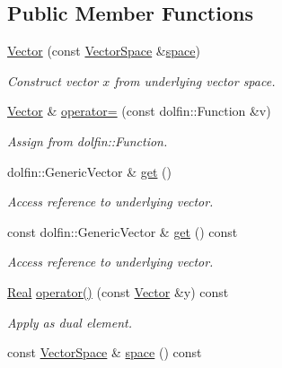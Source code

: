 \subsection*{Public Member Functions}
\begin{DoxyCompactItemize}
\item 
\hyperlink{classSpacy_1_1FEniCS_1_1Vector_ad73e826490b7b7be5588e9c0c9318cb5}{Vector} (const \hyperlink{classSpacy_1_1VectorSpace}{Vector\+Space} \&\hyperlink{classSpacy_1_1VectorBase_aa999dbf9d679d895dfe04c10fbf9f5e9}{space})
\begin{DoxyCompactList}\small\item\em Construct vector $x$ from underlying vector space. \end{DoxyCompactList}\item 
\hyperlink{classSpacy_1_1FEniCS_1_1Vector}{Vector} \& \hyperlink{classSpacy_1_1FEniCS_1_1Vector_ad4d68b813d9374aa83f37ec2b3ad02fc}{operator=} (const dolfin\+::\+Function \&v)
\begin{DoxyCompactList}\small\item\em Assign from dolfin\+::\+Function. \end{DoxyCompactList}\item 
\hypertarget{classSpacy_1_1FEniCS_1_1Vector_afadf508451c68fd767da6a1be4852fed}{}dolfin\+::\+Generic\+Vector \& \hyperlink{classSpacy_1_1FEniCS_1_1Vector_afadf508451c68fd767da6a1be4852fed}{get} ()\label{classSpacy_1_1FEniCS_1_1Vector_afadf508451c68fd767da6a1be4852fed}

\begin{DoxyCompactList}\small\item\em Access reference to underlying vector. \end{DoxyCompactList}\item 
\hypertarget{classSpacy_1_1FEniCS_1_1Vector_ac69fe18ef6818182186f9db82da0f7e2}{}const dolfin\+::\+Generic\+Vector \& \hyperlink{classSpacy_1_1FEniCS_1_1Vector_ac69fe18ef6818182186f9db82da0f7e2}{get} () const \label{classSpacy_1_1FEniCS_1_1Vector_ac69fe18ef6818182186f9db82da0f7e2}

\begin{DoxyCompactList}\small\item\em Access reference to underlying vector. \end{DoxyCompactList}\item 
\hyperlink{classSpacy_1_1Real}{Real} \hyperlink{classSpacy_1_1FEniCS_1_1Vector_a99a75031c47961b9ef1161197c4d3f8e}{operator()} (const \hyperlink{classSpacy_1_1FEniCS_1_1Vector}{Vector} \&y) const 
\begin{DoxyCompactList}\small\item\em Apply as dual element. \end{DoxyCompactList}\item 
\hypertarget{classSpacy_1_1VectorBase_aa999dbf9d679d895dfe04c10fbf9f5e9}{}const \hyperlink{classSpacy_1_1VectorSpace}{Vector\+Space} \& \hyperlink{classSpacy_1_1VectorBase_aa999dbf9d679d895dfe04c10fbf9f5e9}{space} () const \label{classSpacy_1_1VectorBase_aa999dbf9d679d895dfe04c10fbf9f5e9}


\end{DoxyCompactItemize}
